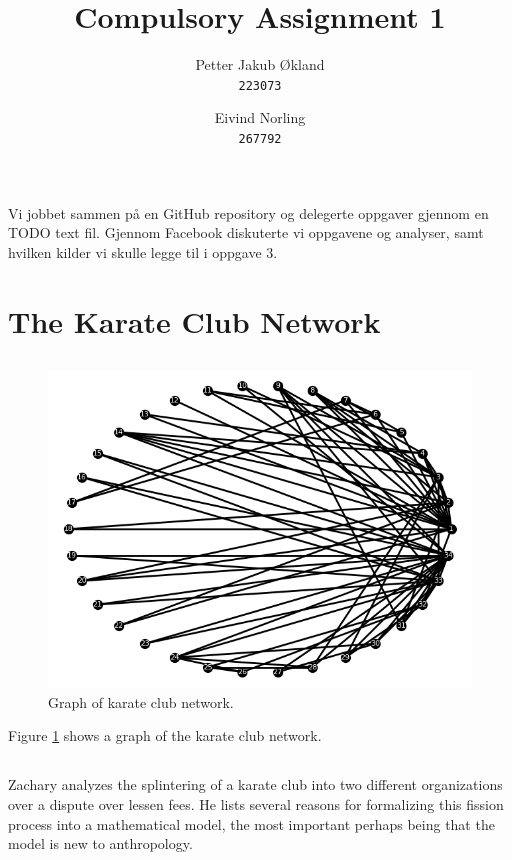 \documentclass[11pt]{article}
\title{ Compulsory Assignment 1}
\author{
  Petter Jakub Økland\\
  \texttt{223073}
  \and
  Eivind Norling\\
  \texttt{267792}
}
\begin{document}
\maketitle

Vi jobbet sammen på en GitHub repository\cite{git} og delegerte oppgaver gjennom en TODO
text fil. Gjennom Facebook diskuterte vi oppgavene og analyser, samt hvilken kilder vi
skulle legge til i oppgave 3.

\section{The Karate Club Network}
\subsection{}
\begin{figure}
  \includegraphics[width=\linewidth]{Figure_1.png}
  \caption{Graph of karate club network.}
  \label{fig:graph model}
\end{figure}

Figure \ref{fig:graph model} shows a graph of the karate club network.

\subsection{}
Zachary\cite{Zachary} analyzes the splintering of a karate club into two different organizations
over a dispute over lessen fees. He lists several reasons for formalizing this fission
process into a mathematical model, the most important perhaps being that the model is
new to anthropology.
\end{document}
